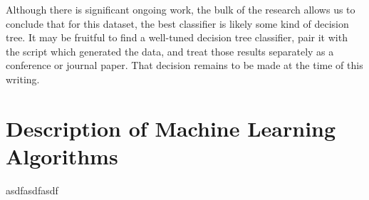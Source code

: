 \documentclass[10pt]{article}
\begin{document}
Although there is significant ongoing work, the bulk of the research allows us to conclude that for this dataset, the best classifier is likely some kind of decision tree.
It may be fruitful to find a well-tuned decision tree classifier, pair it with the script which generated the data, and treat those results separately as a conference or journal paper. 
That decision remains to be made at the time of this writing.




\appendix
\section{Description of Machine Learning Algorithms}\label{ml algo}
asdfasdfasdf
\end{document}
